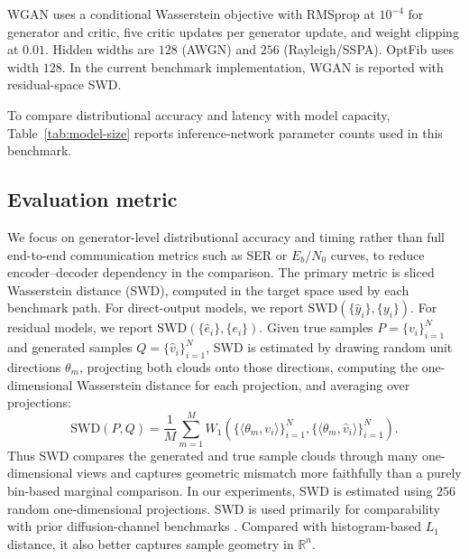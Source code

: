 \documentclass[conference]{IEEEtran}
\begin{document}
WGAN uses a conditional Wasserstein objective with RMSprop at \(10^{-4}\) for generator and critic, five critic updates per generator update, and weight clipping at \(0.01\). Hidden widths are \(128\) (AWGN) and \(256\) (Rayleigh/SSPA). OptFib uses width \(128\). In the current benchmark implementation, WGAN is reported with residual-space SWD.

To compare distributional accuracy and latency with model capacity, Table~\ref{tab:model-size} reports inference-network parameter counts used in this benchmark.




\subsection{Evaluation metric}
We focus on generator-level distributional accuracy and timing rather than full end-to-end communication metrics such as SER or \(E_b/N_0\) curves, to reduce encoder--decoder dependency in the comparison.
The primary metric is sliced Wasserstein distance (SWD), computed in the target space used by each benchmark path.
For direct-output models, we report \(\mathrm{SWD}\!\left(\{\hat{y}_i\}, \{y_i\}\right)\). For residual models, we report \(\mathrm{SWD}\!\left(\{\hat{e}_i\}, \{e_i\}\right)\).
Given true samples \(P=\{v_i\}_{i=1}^N\) and generated samples \(Q=\{\hat v_i\}_{i=1}^N\), SWD is estimated by drawing random unit directions \(\theta_m\), projecting both clouds onto those directions, computing the one-dimensional Wasserstein distance for each projection, and averaging over projections:
\begin{equation*}
\mathrm{SWD}(P,Q)
=
\frac{1}{M}
\sum_{m=1}^M
W_1\!\left(\{\langle \theta_m,v_i\rangle\}_{i=1}^N,\{\langle \theta_m,\hat v_i\rangle\}_{i=1}^N\right).
\end{equation*}
Thus SWD compares the generated and true sample clouds through many one-dimensional views and captures geometric mismatch more faithfully than a purely bin-based marginal comparison.
In our experiments, SWD is estimated using \(256\) random one-dimensional projections.
SWD is used primarily for comparability with prior diffusion-channel benchmarks \cite{paper2309,kimicc2024}. Compared with histogram-based \(L_1\) distance, it also better captures sample geometry in \(\mathbb{R}^n\).
\end{document}
